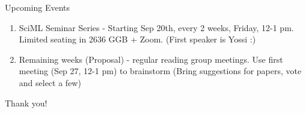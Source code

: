 \documentclass[usenames,dvipsnames]{beamer}
\theoremstyle{definition}
\begin{document}
\begin{frame}{Upcoming Events}
    \begin{enumerate}
        \item SciML Seminar Series - Starting Sep 20th, every 2 weeks, Friday, 12-1 pm. Limited seating in 2636 GGB + Zoom. (First speaker is Yossi :)

        \item Remaining weeks (Proposal) - regular reading group meetings. Use first meeting (Sep 27, 12-1 pm) to brainstorm (Bring suggestions for papers, vote and select a few)
    \end{enumerate}
\end{frame}

\begin{frame}{}
\begin{center}
    \Large{Thank you!}
\end{center}
        
\end{frame}
\end{document}
